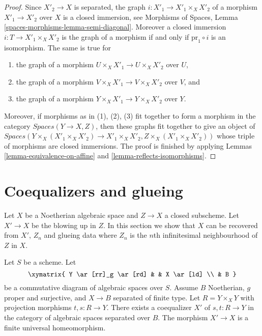 \begin{proof}
Since $X'_2 \to X$ is separated, the graph $i : X'_1 \to X'_1 \times_X X'_2$
of a morphism $X'_1 \to X'_2$ over $X$ is a closed immersion, see
Morphisms of Spaces, Lemma \ref{spaces-morphisms-lemma-semi-diagonal}.
Moreover a closed immersion $i : T \to X'_1 \times_X X'_2$ is the graph of a
morphism if and only if $\text{pr}_1 \circ i$ is an isomorphism.
The same is true for
\begin{enumerate}
\item the graph of a morphism $U \times_X X'_1 \to U \times_X X'_2$ over $U$,
\item the graph of a morphism $V \times_X X'_1 \to V \times_X X'_2$ over $V$,
and
\item the graph of a morphism $Y \times_X X'_1 \to Y \times_X X'_2$ over $Y$.
\end{enumerate}
Moreover, if morphisms as in (1), (2), (3) fit together to form a
morphism in the category $\textit{Spaces}(Y \to X, Z)$, then these
graphs fit together to give an object of
$\textit{Spaces}(Y \times_X (X'_1 \times_X X'_2) \to X'_1 \times_X X'_2,
Z \times_X (X'_1 \times_X X'_2))$
whose triple of morphisms are closed immersions. The proof is finished
by applying Lemmas \ref{lemma-equivalence-on-affine} and
\ref{lemma-reflects-isomorphisms}.
\end{proof}







\section{Coequalizers and glueing}
\label{section-coequalizer-glue}

\noindent
Let $X$ be a Noetherian algebraic space and $Z \to X$ a closed subscheme.
Let $X' \to X$ be the blowing up in $Z$. In this section we show that
$X$ can be recovered from $X'$, $Z_n$ and glueing data where $Z_n$
is the $n$th infinitesimal neighbourhood of $Z$ in $X$.

\begin{lemma}
\label{lemma-coequalizer}
Let $S$ be a scheme. Let
$$
\xymatrix{
Y \ar[rr]_g \ar[rd] & & X \ar[ld] \\
& B
}
$$
be a commutative diagram of algebraic spaces over $S$. Assume
$B$ Noetherian, $g$ proper and surjective, and $X \to B$ separated
of finite type. Let $R = Y \times_X Y$ with projection morphisms
$t, s : R \to Y$.  There exists a coequalizer $X'$ of $s, t : R \to Y$
in the category of algebraic spaces separated over $B$. The morphism
$X' \to X$ is a finite universal homeomorphism.
\end{lemma}

